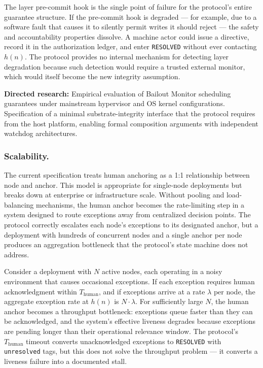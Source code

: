 The \fact{} layer pre-commit hook is the single point of failure for the protocol's entire guarantee structure. If the pre-commit hook is degraded — for example, due to a software fault that causes it to silently permit writes it should reject — the safety and accountability properties dissolve. A machine actor could issue a directive, record it in the authorization ledger, and enter \texttt{RESOLVED} without ever contacting $h(n)$. The protocol provides no internal mechanism for detecting \fact{} layer degradation because such detection would require a trusted external monitor, which would itself become the new integrity assumption.

\medskip\noindent\textbf{Directed research:} Empirical evaluation of Bailout Monitor scheduling guarantees under mainstream hypervisor and OS kernel configurations. Specification of a minimal substrate-integrity interface that the protocol requires from the host platform, enabling formal composition arguments with independent watchdog architectures.

\subsubsection{Scalability.}
The current specification treats human anchoring as a 1:1 relationship between node and anchor. This model is appropriate for single-node deployments but breaks down at enterprise or infrastructure scale. Without pooling and load-balancing mechanisms, the human anchor becomes the rate-limiting step in a system designed to route exceptions away from centralized decision points. The protocol correctly escalates each node's exceptions to its designated anchor, but a deployment with hundreds of concurrent nodes and a single anchor per node produces an aggregation bottleneck that the protocol's state machine does not address.

Consider a deployment with $N$ active nodes, each operating in a noisy environment that causes occasional exceptions. If each exception requires human acknowledgment within $T_{\mathrm{human}}$, and if exceptions arrive at a rate $\lambda$ per node, the aggregate exception rate at $h(n)$ is $N \cdot \lambda$. For sufficiently large $N$, the human anchor becomes a throughput bottleneck: exceptions queue faster than they can be acknowledged, and the system's effective liveness degrades because exceptions are pending longer than their operational relevance window. The protocol's $T_{\mathrm{human}}$ timeout converts unacknowledged exceptions to \texttt{RESOLVED} with \texttt{unresolved} tags, but this does not solve the throughput problem — it converts a liveness failure into a documented stall.

